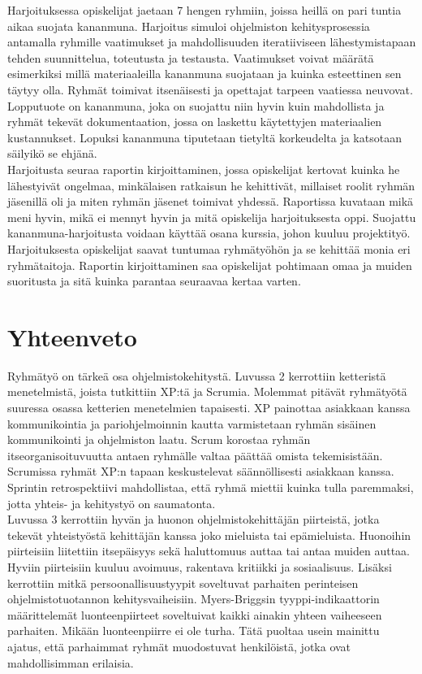 \documentclass[finnish]{../tktltiki2}
\theoremstyle{definition}
\theoremstyle{remark}
\begin{document}
\begin{itemize}
Harjoituksessa opiskelijat jaetaan 7 hengen ryhmiin, joissa heillä on pari tuntia aikaa suojata kananmuna. Harjoitus simuloi ohjelmiston kehitysprosessia antamalla ryhmille vaatimukset ja mahdollisuuden iteratiiviseen lähestymistapaan tehden suunnittelua, toteutusta ja testausta. Vaatimukset voivat määrätä esimerkiksi millä materiaaleilla kananmuna suojataan ja kuinka esteettinen sen täytyy olla. Ryhmät toimivat itsenäisesti ja opettajat tarpeen vaatiessa neuvovat. Lopputuote on kananmuna, joka on suojattu niin hyvin kuin mahdollista ja ryhmät tekevät dokumentaation, jossa on laskettu käytettyjen materiaalien kustannukset. Lopuksi kananmuna tiputetaan tietyltä korkeudelta ja katsotaan säilyikö se ehjänä.\\

Harjoitusta seuraa raportin kirjoittaminen, jossa opiskelijat kertovat kuinka he lähestyivät ongelmaa, minkälaisen ratkaisun he kehittivät, millaiset roolit ryhmän jäsenillä oli ja miten ryhmän jäsenet toimivat yhdessä. Raportissa kuvataan mikä meni hyvin, mikä ei mennyt hyvin ja mitä opiskelija harjoituksesta oppi. Suojattu kananmuna-harjoitusta voidaan käyttää osana kurssia, johon kuuluu projektityö. Harjoituksesta opiskelijat saavat tuntumaa ryhmätyöhön ja se kehittää monia eri ryhmätaitoja. Raportin kirjoittaminen saa opiskelijat pohtimaan omaa ja muiden suoritusta ja sitä kuinka parantaa seuraavaa kertaa varten.

\end{itemize}

\section{Yhteenveto}

Ryhmätyö on tärkeä osa ohjelmistokehitystä. Luvussa 2 kerrottiin ketteristä menetelmistä, joista tutkittiin XP:tä ja Scrumia. Molemmat pitävät ryhmätyötä suuressa osassa ketterien menetelmien tapaisesti. XP painottaa asiakkaan kanssa kommunikointia ja pariohjelmoinnin kautta varmistetaan ryhmän sisäinen kommunikointi ja ohjelmiston laatu. Scrum korostaa ryhmän itseorganisoituvuutta antaen ryhmälle valtaa päättää omista tekemisistään. Scrumissa ryhmät XP:n tapaan keskustelevat säännöllisesti asiakkaan kanssa. Sprintin retrospektiivi mahdollistaa, että ryhmä miettii kuinka tulla paremmaksi, jotta yhteis- ja kehitystyö on saumatonta.\\

Luvussa 3 kerrottiin hyvän ja huonon ohjelmistokehittäjän piirteistä, jotka tekevät yhteistyöstä kehittäjän kanssa joko mieluista tai epämieluista. Huonoihin piirteisiin liitettiin itsepäisyys sekä haluttomuus auttaa tai antaa muiden auttaa. Hyviin piirteisiin kuuluu avoimuus, rakentava kritiikki ja sosiaalisuus. Lisäksi kerrottiin mitkä persoonallisuustyypit soveltuvat parhaiten perinteisen ohjelmistotuotannon kehitysvaiheisiin. Myers-Briggsin tyyppi-indikaattorin määrittelemät luonteenpiirteet soveltuivat kaikki ainakin yhteen vaiheeseen parhaiten. Mikään luonteenpiirre ei ole turha. Tätä puoltaa usein mainittu ajatus, että parhaimmat ryhmät muodostuvat henkilöistä, jotka ovat mahdollisimman erilaisia.\\
\end{document}

